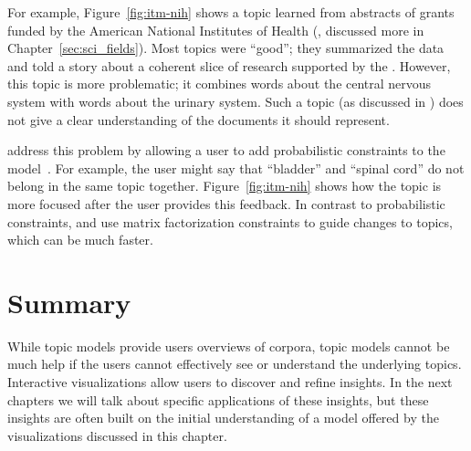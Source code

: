 For example, Figure~\ref{fig:itm-nih} shows a topic learned from abstracts of
grants funded by the American National Institutes of Health
(, discussed more in Chapter~\ref{sec:sci_fields}).  Most
topics were ``good''; they summarized the data and told a story about
a coherent slice of research supported by the .  However,
this topic is more problematic; it combines words about the central
nervous system with words about the urinary system.  Such a topic (as
discussed in \citet{mimno-11}) does not give a clear understanding of the
documents it should represent.


\citet{hu-14:itm} address this problem by allowing a user to add probabilistic
constraints to the model~\citep{boyd-graber-07,andrzejewski-09}.  For example,
the user might say that ``bladder'' and ``spinal cord'' do not belong in the same
topic together.  Figure~\ref{fig:itm-nih} shows how the topic is more focused after the
user provides this feedback.  In contrast to probabilistic constraints,
\citet{choo-13} and \citet{lund-17} use matrix factorization constraints to guide changes
to topics, which can be much faster.

\section{Summary}

While topic models provide users overviews of corpora, topic models
cannot be much help if the users cannot effectively see or understand
the underlying topics.
Interactive visualizations allow users to discover and
refine insights.  In the next chapters we will talk about specific applications of
these insights, but these insights are often built on the initial understanding
of a model offered by the visualizations discussed in this chapter.
